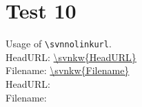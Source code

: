 \documentclass[12pt]{report}
\begin{document}
\chapter{Test 10}
Usage of \verb+\svnnolinkurl+.\\

\noindent
HeadURL: \url{\svnkw{HeadURL}} \\
Filename: \url{\svnkw{Filename}} \\

\noindent
HeadURL:  \\
Filename:  \\
\end{document}
